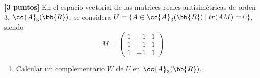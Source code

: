 \documentclass[12pt]{article}
\begin{document}
\begin{ejercicio}\textbf{[3 puntos]}
    En el espacio vectorial de las matrices reales antisimétricas de orden 3, $\cc{A}_3(\bb{R})$, se considera $U=\{A\in \cc{A}_3(\bb{R})\mid tr(AM)=0\}$, siendo
    \begin{equation*}
        M=\left(\begin{array}{ccc}
            1 & -1 & 1 \\
            1 & -1 & 1 \\
            1 & -1 & 1
        \end{array}\right)
    \end{equation*}
    \begin{enumerate}
        \item Calcular un complementario $W$ de $U$ en $\cc{A}_3(\bb{R})$.
        

\end{enumerate}
\end{ejercicio}
\end{document}
